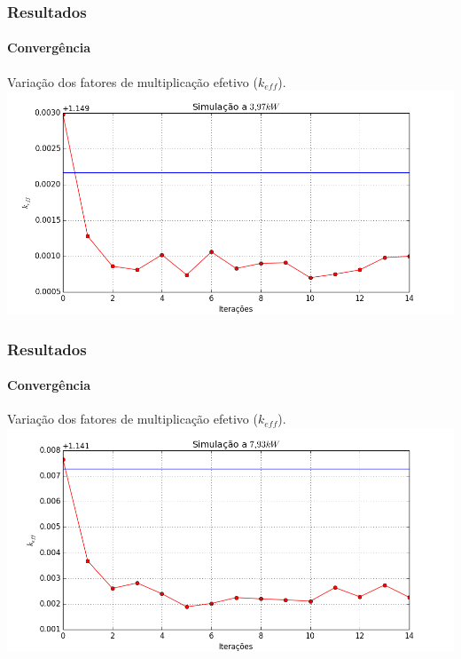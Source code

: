\documentclass[svgnames,smaller,table]{beamer}
\begin{document}
\begin{frame}
  \frametitle{Resultados}
  \framesubtitle{Convergência}
  Variação dos fatores de multiplicação efetivo ($k_{eff}$).
  \centering\includegraphics[scale=0.45]{../figuras/plot100.png}
  \label{fig:keff100}
\end{frame}

\begin{frame}
  \frametitle{Resultados}
  \framesubtitle{Convergência}
  Variação dos fatores de multiplicação efetivo ($k_{eff}$).
  \centering\includegraphics[scale=0.45]{../figuras/plot200.png}
  \label{fig:keff200}
\end{frame}




\end{document}
